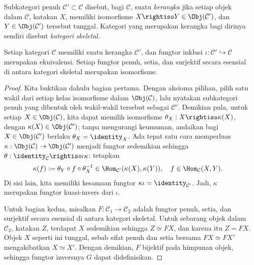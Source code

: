 Subkategori penuh $\mathcal{C}' \subset \mathcal{C}$ disebut, bagi $\mathcal{C}$, suatu \emph{kerangka} jika setiap objek dalam $\mathcal{C}$, katakan $X$, memiliki isomorfisme $X \rightiso Y \in \Obj(\mathcal{C}')$, dan $Y \in \Obj(\mathcal{C}')$ tersebut tunggal. Kategori yang merupakan kerangka bagi dirinya sendiri disebut \emph{kategori skeletal}.

\begin{lemma}\label{prop:skeletal-cat-isom}
	Setiap kategori $\mathcal{C}$ memiliki suatu kerangka $\mathcal{C}'$, dan fungtor inklusi $\iota: \mathcal{C}' \hookrightarrow \mathcal{C}$ merupakan ekuivalensi. Setiap fungtor penuh, setia, dan surjektif secara esensial di antara kategori skeletal merupakan isomorfisme.
\end{lemma}
\begin{proof}
	Kita buktikan dahulu bagian pertama. Dengan aksioma pilihan, pilih satu wakil dari setiap kelas isomorfisme dalam $\Obj(\mathcal{C})$, lalu nyatakan subkategori penuh yang dibentuk oleh wakil-wakil tersebut sebagai $\mathcal{C}'$. Demikian pula, untuk setiap $X \in \Obj(\mathcal{C})$, kita dapat memilih isomorfisme $\theta_X: X \rightiso \kappa(X) $, dengan $\kappa(X) \in \Obj(\mathcal{C}')$; tanpa mengurangi keumuman, andaikan bagi $X \in \Obj(\mathcal{C}')$ berlaku $\theta_X = \identity_X$. Ada tepat satu cara memperluas $\kappa: \Obj(\mathcal{C}) \to \Obj(\mathcal{C}')$ menjadi fungtor sedemikian sehingga $\theta: \identity_{\mathcal{C}} \rightiso \iota \kappa$: tetapkan
	\[ \kappa(f) := \theta_Y \circ f \circ \theta_X^{-1} \in \Hom_{\mathcal{C}'}(\kappa(X), \kappa(Y)), \quad f \in \Hom_{\mathcal{C}}(X, Y). \]
	Di sisi lain, kita memiliki kesamaan fungtor $\kappa\iota = \identity_{\mathcal{C}'}$. Jadi, $\kappa$ merupakan fungtor kuasi-invers dari $\iota$.
	
	Untuk bagian kedua, misalkan $F: \mathcal{C}_1 \to \mathcal{C}_2$ adalah fungtor penuh, setia, dan surjektif secara esensial di antara kategori skeletal. Untuk sebarang objek dalam $\mathcal{C}_2$, katakan $Z$, terdapat $X$ sedemikian sehingga $Z \simeq FX$, dan karena itu $Z = FX$. Objek $X$ seperti ini tunggal, sebab sifat penuh dan setia bersama $FX \simeq FX'$ mengakibatkan $X \simeq X'$. Dengan demikian, $F$ bijektif pada himpunan objek, sehingga fungtor inversnya $G$ dapat didefinisikan.
\end{proof}

